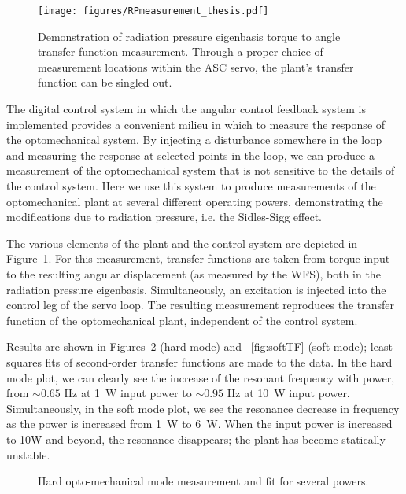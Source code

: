 \begin{figure}
\begin{centering}
\texttt{[image: figures/RPmeasurement\_thesis.pdf]}
\caption[Demonstration of radiation pressure eigenbasis torque to
angle transfer function measurement]{Demonstration of radiation
  pressure eigenbasis torque to angle transfer function
  measurement. Through a proper choice of measurement locations within
  the ASC servo, the plant's transfer function can be singled out.}
\label{fig:RPTFmeasurement}
\end{centering}
\end{figure}

The digital control system in which the angular control feedback
system is implemented provides a convenient milieu in which to measure
the response of the optomechanical system. By injecting a disturbance
somewhere in the loop and measuring the response at selected points in
the loop, we can produce a measurement of the optomechanical system
that is not sensitive to the details of the control system. Here we
use this system to produce measurements of the optomechanical plant at
several different operating powers, demonstrating the modifications due
to radiation pressure, i.e. the Sidles-Sigg effect.

The various elements of the plant and the control system are depicted
in Figure~\ref{fig:RPTFmeasurement}.  For this measurement, transfer
functions are taken from torque input to the resulting angular
displacement (as measured by the WFS), both in the radiation pressure
eigenbasis.  Simultaneously, an excitation is injected into the
control leg of the servo loop.  The resulting measurement reproduces
the transfer function of the optomechanical plant, independent of the
control system.

Results are shown in Figures~\ref{fig:hardTF} (hard mode) and
~\ref{fig:softTF} (soft mode); least-squares fits of second-order
transfer functions are made to the data.  In the hard mode plot, we
can clearly see the increase of the resonant frequency with power,
from $\sim0.65$ Hz at 1~W input power to $\sim0.95$ Hz at 10~W input
power.  Simultaneously, in the soft mode plot, we see the resonance
decrease in frequency as the power is increased from 1~W to 6~W.  When
the input power is increased to 10W and beyond, the resonance
disappears; the plant has become statically unstable.

\begin{figure}
\begin{centering}
\caption{Hard opto-mechanical mode measurement and fit for several
 powers.}
\label{fig:hardTF}
\end{centering}
\end{figure}

